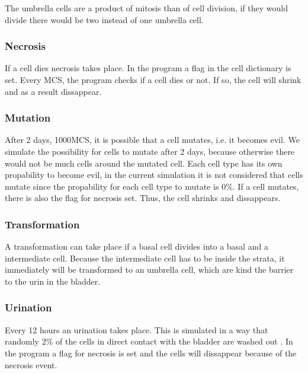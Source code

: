 The umbrella cells are a product of mitosis than of cell division, if they would divide there would be two instead of one umbrella cell.

\subsubsection{Necrosis}
If a cell dies necrosis takes place. In the program a flag in the cell dictionary is set. Every \ac{MCS}, the program checks if a cell dies or not. If so, the cell will shrink and as a result dissappear.

\subsubsection{Mutation}
After 2 days, 1000\ac{MCS}, it is possible that a cell mutates, i.e. it becomes evil. We simulate the possibility for cells to mutate after 2 days, because otherwise there would not be much cells around the mutated cell. Each cell type has its own propability to become evil, in the current simulation it is not considered that cells mutate since the propability for each cell type to mutate is 0\%. \newline
If a cell mutates, there is also the flag for necrosis set. Thus, the cell shrinks and dissappears.


\subsubsection{Transformation}
A transformation can take place if a basal cell divides into a basal and a intermediate cell. Because the intermediate cell has to be inside the strata, it immediately will be transformed to an umbrella cell, which are kind the barrier to the urin in the bladder. 


\subsubsection{Urination}
Every 12 hours an urination takes place. This is simulated in a way that randomly 2\% of the cells in direct contact with the bladder are washed out \cite{Torelli2017}. In the program a flag for necrosis is set and the cells will dissappear because of the necrosis event.









